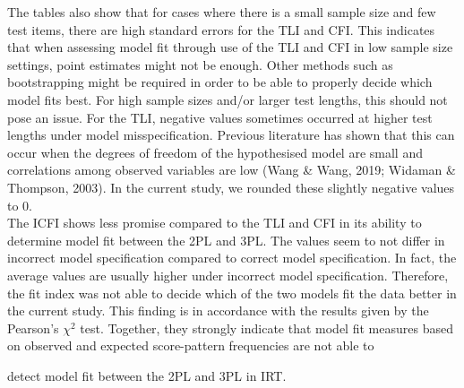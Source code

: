 \documentclass[Royal,sageapa,times,doublespace]{sagej}
\begin{document}
\indent The tables also show that for cases where there is a small sample size and few test items, there are high standard errors for the TLI and CFI. This indicates that when assessing model fit through use of the TLI and CFI in low sample size settings, point estimates might not be enough. Other methods such as bootstrapping might be required in order to be able to properly decide which model fits best. For high sample sizes and/or larger test lengths, this should not pose an issue. For the TLI, negative values sometimes occurred at higher test lengths under model misspecification. Previous literature has shown that this can occur when the degrees of freedom of the hypothesised model are small and correlations among observed variables are low (Wang \& Wang, 2019; Widaman \& Thompson, 2003). In the current study, we rounded these slightly negative values to 0. \\
\indent The ICFI shows less promise compared to the TLI and CFI in its ability to determine model fit between the 2PL and 3PL. The values seem to not differ in incorrect model specification compared to correct model specification. In fact, the average values are usually higher under incorrect model specification. Therefore, the fit index was not able to decide which of the two models fit the data better in the current study. This finding is in accordance with the results given by the Pearson's $\chi^2$ test. Together, they strongly indicate that model fit measures based on observed and expected score-pattern frequencies are not able to 

detect model fit between the 2PL and 3PL in IRT. %

\\
\end{document}
